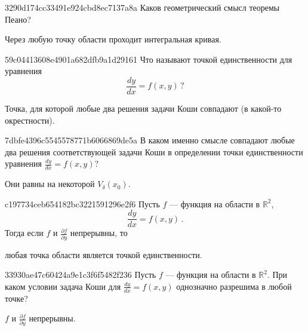 \begin{note}{3290d174cc33491e924cbd8ec7137a8a}
    Каков геометрический смысл теоремы Пеано?

    \begin{cloze}{1}
        Через любую точку области проходит интегральная кривая.
    \end{cloze}
\end{note}

\begin{note}{59c04413608e4901a682dfb9a1d29161}
    Что называют точкой единственности для уравнения
    \[
        \frac{dy}{dx} = f(x, y)\,?
    \]

    \begin{cloze}{1}
        Точка, для которой любые два решения задачи Коши совпадают (в какой-то окрестности).
    \end{cloze}
\end{note}

\begin{note}{7dbfe4396c5545578771b6066869de5a}
    В каком именно смысле совпадают любые два решения соответствующей задачи Коши в определении точки единственности уравнения \({ \frac{dy}{dx} = f(x, y) }\)?

    \begin{cloze}{1}
        Они равны на некоторой \({ V_{\delta}(x_0) }\).
    \end{cloze}
\end{note}

\begin{note}{c197734ceb654182bc3221591296e2f6}
    Пусть \({ f }\) --- функция на области в \({ \mathbb R^2 }\),
    \[
        \frac{dy}{dx} = f(x, y)\,.
    \]
    Тогда если \({ f }\) и \({ \frac{\partial f}{\partial y} }\) непрерывны, то \begin{icloze}{1}любая точка области является точкой единственности.\end{icloze}
\end{note}

\begin{note}{33930ae47c60424a9e1c3f6f5482f236}
    Пусть \({ f }\) --- функция на области в \({ \mathbb R^2 }\).
    При каком условии задача Коши для \({ \frac{dy}{dx} = f(x, y) }\) однозначно разрешима в любой точке?

    \begin{cloze}{1}
        \({ f }\) и \({ \frac{\partial f}{\partial y} }\) непрерывны.
    \end{cloze}
\end{note}

